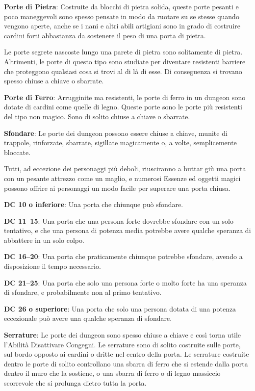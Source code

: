 \documentclass[a4paper,11pt,twoside,openany]{book}
\begin{document}
\textbf{Porte di Pietra}: Costruite da blocchi di pietra solida, queste porte pesanti e poco maneggevoli sono spesso pensate in modo da ruotare su se stesse quando vengono aperte, anche se i nani e altri abili artigiani sono in grado di costruire cardini forti abbastanza da sostenere il peso di una porta di pietra.

Le porte segrete nascoste lungo una parete di pietra sono solitamente di pietra. Altrimenti, le porte di questo tipo sono studiate per diventare resistenti barriere che proteggono qualsiasi cosa si trovi al di là di esse. Di conseguenza si trovano spesso chiuse a chiave o sbarrate.

\textbf{Porte di Ferro}: Arrugginite ma resistenti, le porte di ferro in un dungeon sono dotate di cardini come quelle di legno. Queste porte sono le porte più resistenti del tipo non magico. Sono di solito chiuse a chiave o sbarrate.

\textbf{Sfondare}: Le porte dei dungeon possono essere chiuse a chiave, munite di trappole, rinforzate, sbarrate, sigillate magicamente o, a volte, semplicemente bloccate.

Tutti, ad eccezione dei personaggi più deboli, riusciranno a buttar giù una porta con un pesante attrezzo come un maglio, e numerosi Essenze ed oggetti magici possono offrire ai personaggi un modo facile per superare una porta chiusa.

\textbf{DC 10 o inferiore}: Una porta che chiunque può sfondare.

\textbf{DC 11--15}: Una porta che una persona forte dovrebbe sfondare con un solo tentativo, e che una persona di potenza media potrebbe avere qualche speranza di abbattere in un solo colpo.

\textbf{DC 16--20}: Una porta che praticamente chiunque potrebbe sfondare, avendo a disposizione il tempo necessario.

\textbf{DC 21--25}: Una porta che solo una persona forte o molto forte ha una speranza di sfondare, e probabilmente non al primo tentativo.

\textbf{DC 26 o superiore}: Una porta che solo una persona dotata di una potenza eccezionale può avere una qualche speranza di sfondare.

\textbf{Serrature}: Le porte dei dungeon sono spesso chiuse a chiave e così torna utile l'Abilità Disattivare Congegni. Le serrature sono di solito costruite sulle porte, sul bordo opposto ai cardini o dritte nel centro della porta. Le serrature costruite dentro le porte di solito controllano una sbarra di ferro che si estende dalla porta dentro il muro che la sostiene, o una sbarra di ferro o di legno massiccio scorrevole che si prolunga dietro tutta la porta.
\end{document}
